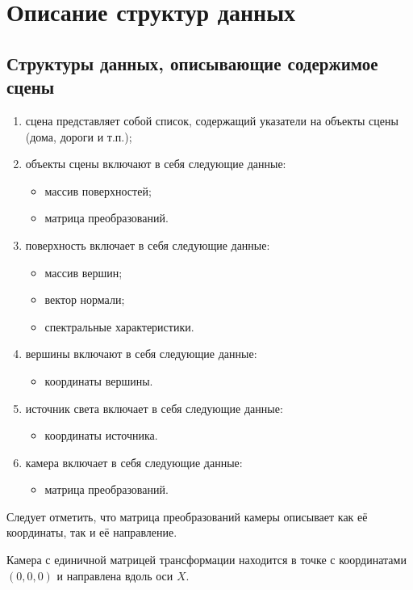 \section{Описание структур данных}

\subsection*{Структуры данных, описывающие содержимое сцены}

\begin{enumerate}
    \item сцена представляет собой список, содержащий указатели на объекты сцены (дома, дороги и т.п.);
    \item объекты сцены включают в себя следующие данные:\begin{itemize}
        \item массив поверхностей;
        \item матрица преобразований.
    \end{itemize}
    \item поверхность включает в себя следующие данные: \begin{itemize}
        \item массив вершин;
        \item вектор нормали;
        \item спектральные характеристики.
    \end{itemize}
    \item вершины включают в себя следующие данные: \begin{itemize}
        \item координаты вершины.
    \end{itemize}
    \item источник света включает в себя следующие данные: \begin{itemize}
        \item координаты источника.
    \end{itemize}
    \item камера включает в себя следующие данные: \begin{itemize}
        \item матрица преобразований.
    \end{itemize}
\end{enumerate}

Следует отметить, что матрица преобразований камеры описывает как её координаты, так и её направление. 

Камера с единичной матрицей трансформации находится в точке с координатами $(0,0,0)$ и направлена вдоль оси $X$.

